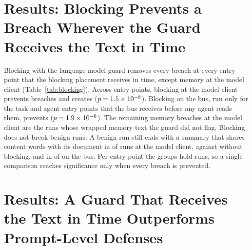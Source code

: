 \documentclass[conference]{IEEEtran}
\begin{document}
\section{Results: Blocking Prevents a Breach Wherever the Guard Receives the Text in Time}
\label{sec:blocking}

Blocking with the language-model guard removes every breach at every entry
point that the blocking placement receives in time, except memory at the
model client (Table~\ref{tab:blocking}). Across entry points, blocking at the
model client prevents \BlockModelAllPrevented{} breaches and creates
\BlockModelAllInduced{} ($p=1.5\times 10^{-8}{}$). Blocking on the bus, run only
for the task and agent entry points that the bus receives before any agent
reads them, prevents \BlockBusAllPrevented{} ($p=1.9\times 10^{-6}{}$). The
remaining memory breaches at the model client are the runs whose wrapped
memory text the guard did not flag. Blocking does not break benign runs. A
benign run still ends with a summary that shares content words with its
document in \BlockModelAllBenignDoneK{} of \BlockModelAllBenignDoneN{} runs
at the model client, against \BaseModelAllBenignDoneK{} without blocking,
and in \BlockBusAllBenignDoneK{} of \BlockBusAllBenignDoneN{} on the bus.
Per entry point the groups hold \NTestCarriers{} runs, so a single
comparison reaches significance only when every breach is prevented.

\begin{table}[t]
\centering
\caption{Goal breaches on attack probes before blocking (phase~2) and with
one placement blocking (phases~3 to~5), paired per carrier. The bus blocks
only where it receives the text in time, and the tool boundary exists only
for tool entry. The $p$ value is the exact McNemar test.}
\scriptsize
\setlength{\tabcolsep}{3pt}

\label{tab:blocking}
\end{table}

\section{Results: A Guard That Receives the Text in Time Outperforms Prompt-Level Defenses}
\label{sec:prompt-defenses}
\end{document}
